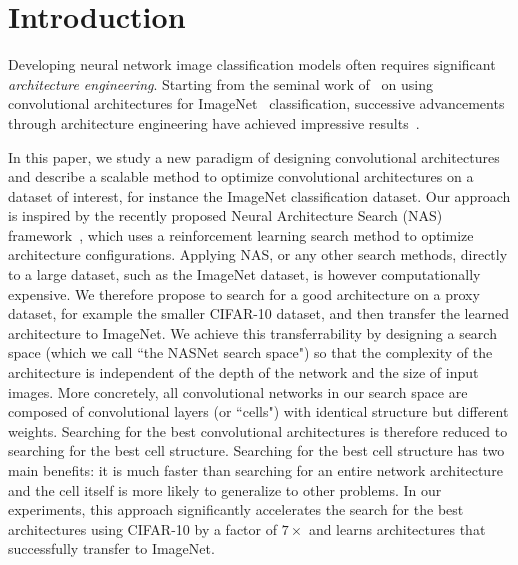 \documentclass[10pt,twocolumn,letterpaper]{article}
\begin{document}
\section{Introduction}

Developing neural network image classification models often requires significant \emph{architecture engineering}. Starting from the seminal work of~\cite{krizhevsky2012imagenet} on using convolutional architectures \cite{fukushima1982neocognitron,lecun1998gradient} for ImageNet~\cite{deng2009imagenet} classification, successive advancements through architecture engineering have achieved impressive results~\cite{simonyan2014very,szegedy2015going,he2015deep,szegedy2016rethinking,szegedy2016inception,xie2016aggregated}. 


In this paper, we study a new paradigm of designing convolutional architectures and describe a scalable method to optimize convolutional architectures on a dataset of interest, for instance the ImageNet classification dataset. 
Our approach is inspired by the recently proposed Neural Architecture Search (NAS) framework~\cite{zoph2017neural}, which uses a reinforcement learning search method to optimize architecture configurations. Applying NAS, or any other search methods, directly to a large dataset, such as the ImageNet dataset, is however computationally expensive. We therefore propose to search for a good architecture on a proxy dataset, for example the smaller CIFAR-10 dataset, and then transfer the learned architecture to ImageNet. We achieve this transferrability by designing a search space (which we call ``the NASNet search space") so that the complexity of the architecture is independent of the depth of the network and the size of input images. More concretely, all convolutional networks in our search space are composed of convolutional layers (or ``cells") with identical structure but different weights. Searching for the best convolutional architectures is therefore reduced to searching for the best cell structure. Searching for the best cell structure has two main benefits: it is much faster than searching for an entire network architecture and the cell itself is more likely to generalize to other problems. 
In our experiments, this approach significantly accelerates the search for the best architectures using CIFAR-10 by a factor of $7\times$ and learns architectures that successfully transfer to ImageNet.
\end{document}
